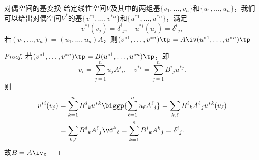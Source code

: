 \begin{theorem}{对偶空间的基变换}{}
	给定线性空间$V$及其中的两组基$\{v_1,\ldots,v_n\}$和$\{u_1,\ldots,u_n\}$，我们可以给出对偶空间$V^\ast$的基$\{v^{\ast 1},\ldots,v^{\ast n}\}$和$\{u^{\ast 1},\ldots,u^{\ast n}\}$，满足
	\[
		v^{\ast i}(v_j)=\delta^i{}_j,\quad u^{\ast i}(u_j)=\delta^i{}_j,
	\]
	若$(v_1,\ldots,v_n)=(u_1,\ldots,u_n)A$，则$(v^{\ast 1},\ldots,v^{\ast n})\tp=A\iv(u^{\ast 1},\ldots,u^{\ast n})\tp$
\end{theorem}
\begin{proof}
	若$(v^{\ast 1},\ldots,v^{\ast n})\tp=B(u^{\ast 1},\ldots,u^{\ast n})\tp$，即
	\[
		v_i=\sum_{j=1}^nu_jA^j{}_i,\quad v^{\ast i}=\sum_{j=1}^nB^i{}_ju^{\ast j}.
	\]
	则
	\begin{align*}
		v^{\ast i}(v_j)&=\sum_{k=1}^nB^i{}_ku^{\ast k}\biggp{\sum_{\ell=1}^n u_\ell A^\ell{}_j}=\sum_{k,\ell}B^i{}_kA^\ell{}_ju^{\ast k}(u_\ell)\\
		&=\sum_{k,\ell}B^i{}_kA^\ell{}_j\vd^k{}_\ell=\sum_{k=1}^nB^i{}_kA^k{}_j=\delta^i{}_j.
	\end{align*}
	故$B=A\iv$。
\end{proof}

